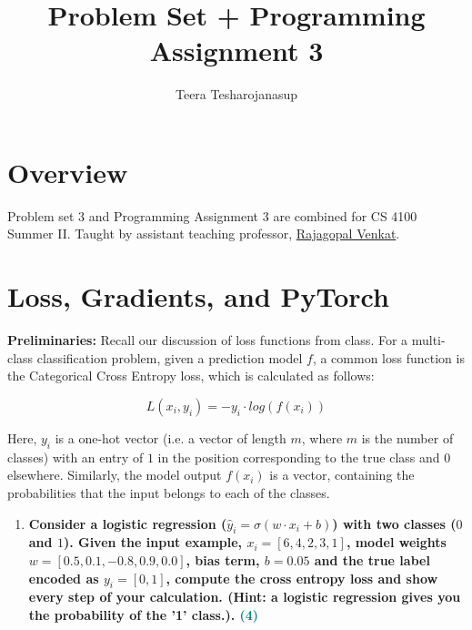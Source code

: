 \documentclass[a4paper]{article}
\begin{document}
\title{\textbf{\huge{Problem Set + Programming Assignment 3}}}

\author{\textbf\large{Teera Tesharojanasup}}


\date{}

\maketitle
\begin{sloppypar}

\section*{Overview}

Problem set 3 and Programming Assignment 3 are combined for CS 4100 Summer II. Taught by assistant teaching professor, \href{https://rajagopalvenkat.com/}{Rajagopal Venkat}. \cite{MISC:1}

\section{Loss, Gradients, and PyTorch}

\par \textbf{Preliminaries:} Recall our discussion of loss functions from class. For a multi-class classification problem, given a prediction model $f$, 
a common loss function is the Categorical Cross Entropy loss, which is calculated as follows:

\[ L(x_i, y_i) = -y_i \cdot log(f(x_i))\]

Here, $y_i$ is a one-hot vector (i.e. a vector of length $m$, where $m$ is the number of classes)
with an entry of $1$ in the position corresponding to the true class and $0$ elsewhere. Similarly, 
the model output $f(x_i)$ is a vector, containing the probabilities that the input belongs
to each of the classes.


\begin{enumerate}[start=1,label=Q\arabic*,left=0pt]
    \item \textbf{Consider a logistic regression ($\hat{y}_i = \sigma(w \cdot x_i + b)$) with two classes ($0$ and $1$). Given
    the input example, $x_i = [6, 4, 2, 3, 1]$, model weights $w = [0.5, 0.1, -0.8, 0.9, 0.0]$, bias term,
    $b = 0.05$ and the true label encoded as $y_i = [0, 1]$, compute the cross entropy loss and
    show every step of your calculation. (Hint: a logistic regression gives you the probability of the '1' class.). \hfill \textcolor{teal}{(4)}}
    

\end{enumerate}
\end{sloppypar}
\end{document}
